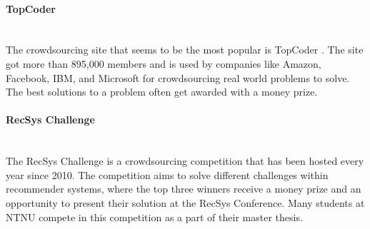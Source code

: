 \paragraph*{TopCoder} \hfill \\
The crowdsourcing site that seems to be the most popular is TopCoder \cite{TOPCODER}. The site got more than 895,000 members and is used by companies like Amazon, Facebook, IBM, and Microsoft for crowdsourcing real world problems to solve. The best solutions to a problem often get awarded with a money prize.

\paragraph*{RecSys Challenge} \hfill \\
The RecSys Challenge \cite{RECSYS} is a crowdsourcing competition that has been hosted every year since 2010. The competition aims to solve different challenges within recommender systems, where the top three winners receive a money prize and an opportunity to present their solution at the RecSys Conference. Many students at NTNU compete in this competition as a part of their master thesis.


